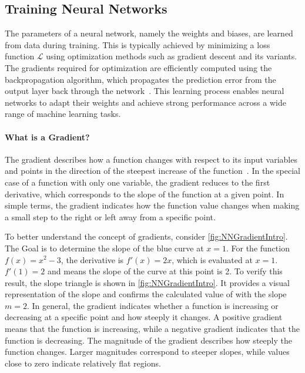 \subsection{Training Neural Networks}
The parameters of a neural network, namely the weights and biases, are learned from data during training. This is typically achieved by minimizing a loss function $\mathcal{L}$ using optimization methods such as gradient descent and its variants. The gradients required for optimization are efficiently computed using the backpropagation algorithm, which propagates the prediction error from the output layer back through the network~\cite{Rumelhart1986LearningRB}. This learning process enables neural networks to adapt their weights and achieve strong performance across a wide range of machine learning tasks.

\paragraph{What is a Gradient?} 
The gradient describes how a function changes with respect to its input variables and points in the direction of the steepest increase of the function~\cite{Rumelhart1986LearningRB, Bottou2016OptimizationMF}. In the special case of a function with only one variable, the gradient reduces to the first derivative, which corresponds to the slope of the function at a given point.
In simple terms, the gradient indicates how the function value changes when making a small step to the right or left away from a specific point.



To better understand the concept of gradients, consider \autoref{fig:NNGradientIntro}. The Goal is to determine the slope of the blue curve at $x=1$. For the function $f(x)=x^2-3$, the derivative is $f'(x)=2x$, which is evaluated at $x=1$. $f'(1)=2$ and means the slope of the curve at this point is 2. To verify this result, the slope triangle is shown in \autoref{fig:NNGradientIntro}. It provides a visual representation of the slope and confirms the calculated value of with the slope $m=2$.
In general, the gradient indicates whether a function is increasing or decreasing at a specific point and how steeply it changes. A positive gradient means that the function is increasing, while a negative gradient indicates that the function is decreasing. The magnitude of the gradient describes how steeply the function changes. Larger magnitudes correspond to steeper slopes, while values close to zero indicate relatively flat regions.

